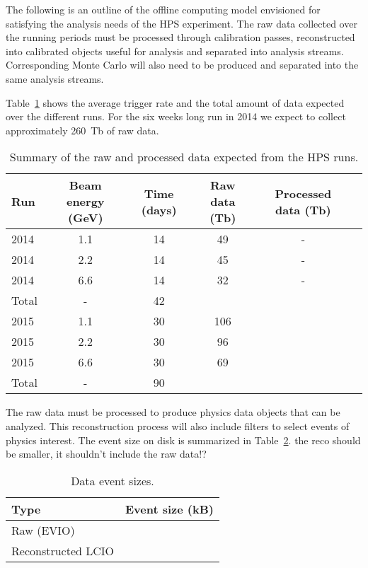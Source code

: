 
The following is an outline of the offline computing model envisioned for satisfying the analysis needs of the HPS experiment. The raw data collected over the running periods must be processed through calibration passes, reconstructed into calibrated objects useful for analysis and separated into analysis streams. Corresponding Monte Carlo will also need to be produced and separated into the same analysis streams.

Table~\ref{tab:data_rates} shows the average trigger rate and the total amount of data expected over the 
different runs. For the six weeks long run in 2014 we expect to collect approximately 260~Tb of raw data.
\begin{table}[]
\centering
\begin{tabular}{|l|c|c|c|c|c|}
\hline
Run & Beam energy (GeV) & Time (days) & Raw data (Tb) & Processed data (Tb)\\
\hline
2014 & 1.1 & 14 & 49 & - \\
2014 & 2.2 & 14 & 45 & -  \\
2014 & 6.6 & 14 & 32 & -  \\
\hline
Total & - & 42 &  &  & \\
\hline
2015 & 1.1 & 30 & 106 & \\
2015 & 2.2 & 30 & 96 & \\
2015 & 6.6 & 30 & 69 & \\
\hline
Total & - & 90 & & \\
\hline
\end{tabular}
\caption{{\small Summary of the raw and processed data expected from the HPS runs. }}
\label{tab:data_rates}
\end{table}
The raw data must be processed to produce physics data objects that can be analyzed. This reconstruction process will also include filters to select events of physics interest. The event size on disk is summarized 
in Table~\ref{tab:raw_data_size}. {\color{red} the reco should be smaller, it shouldn't include the raw data!?}
\begin{table}[]
\centering
\begin{tabular}{|l|c|}
\hline
Type & Event size (kB) \\ 
\hline
Raw (EVIO)  &  \\
\hline
Reconstructed LCIO & \\
\hline
\end{tabular}
\caption{{\small Data event sizes. }}
\label{tab:raw_data_size}
\end{table}

